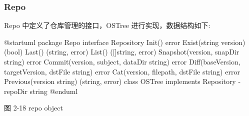 \documentclass{utart}
\begin{document}
\subsubsection{Repo}
Repo 中定义了仓库管理的接口，OSTree 进行实现，数据结构如下:
\begin{center}
  \begin{adjustbox}{scale=0.75}
    \begin{plantuml}
      @startuml
      package Repo {
        interface Repository {
          Init() error
          Exist(string version)(bool)
          Last() (string, error)
          List() ([]string, error)
          Snapshot(version, snapDir string) error
          Commit(version, subject, dataDir string) error
          Diff(baseVersion, targetVersion, dstFile string) error
          Cat(version, filepath, dstFile string) error
          Previous(version string) (string, error)
        }
        class OSTree implements Repository {
          - repoDir string
        }
      }
      @enduml
    \end{plantuml}
  \end{adjustbox}

  图 2-18 repo object
\end{center}
\end{document}
